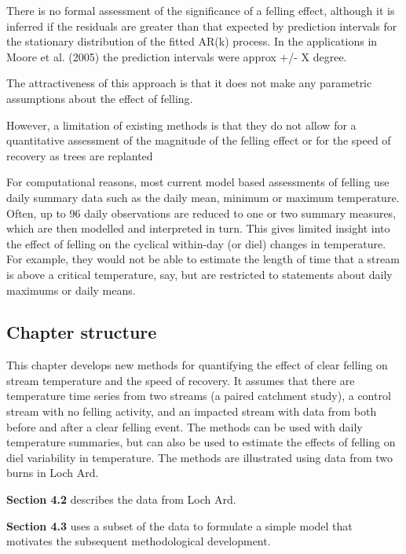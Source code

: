 There is no formal assessment of the significance of a felling effect, although it is inferred if the residuals are greater than that expected by prediction intervals for the stationary distribution of the fitted AR(k) process. In the applications in Moore et al. (2005) the prediction intervals were approx +/- X degree.

The attractiveness of this approach is that it does not make any parametric assumptions about the effect of felling.

However, a limitation of existing methods is that they do not allow for a quantitative assessment of the magnitude of the felling effect or for the speed of recovery as trees are replanted 

For computational reasons, most current model based assessments of felling use daily summary data such as the daily mean, minimum or maximum temperature.  Often, up to 96 daily observations are reduced to one or two summary measures, which are then modelled and interpreted in turn.  This gives limited insight into the effect of felling on the cyclical within-day (or diel) changes in temperature.  For example, they would not be able to estimate the length of time that a stream is above a critical temperature, say, but are restricted to statements about daily maximums or daily means.




\subsection{Chapter structure}

This chapter develops new methods for quantifying the effect of clear felling on stream temperature and the speed of recovery.  It assumes that there are temperature time series from two streams (a paired catchment study), a control stream with no felling activity, and an impacted stream with data from both before and after a clear felling event.  The methods can be used with daily temperature summaries, but can also be used to estimate the effects of felling on diel variability in temperature.  The methods are illustrated using data from two burns in Loch Ard.

\textbf{Section 4.2} describes the data from Loch Ard.  

\textbf{Section 4.3} uses a subset of the data to formulate a simple model that motivates the subsequent methodological development.

